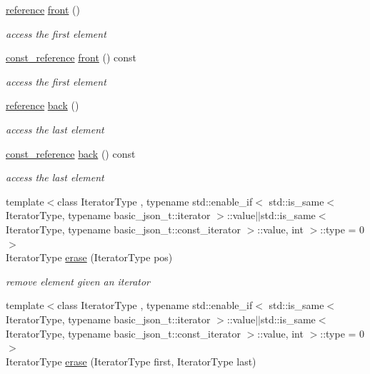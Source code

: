 \begin{DoxyCompactItemize}
\hyperlink{classnlohmann_1_1basic__json_a220ae98554a76205fb7f8822d36b2d5a}{reference} \hyperlink{classnlohmann_1_1basic__json_a5417ca43ae5e7a3a2f82eee2d915c6ed}{front} ()
\begin{DoxyCompactList}\small\item\em access the first element \end{DoxyCompactList}\item 
\hyperlink{classnlohmann_1_1basic__json_ab8a1c33ee7b154fc41ca2545aa9724e6}{const\+\_\+reference} \hyperlink{classnlohmann_1_1basic__json_aa610b6e86ca6306e89ea276befe7b2a2}{front} () const 
\begin{DoxyCompactList}\small\item\em access the first element \end{DoxyCompactList}\item 
\hyperlink{classnlohmann_1_1basic__json_a220ae98554a76205fb7f8822d36b2d5a}{reference} \hyperlink{classnlohmann_1_1basic__json_a30914ad0767ccdc3633f88a906ed7dfa}{back} ()
\begin{DoxyCompactList}\small\item\em access the last element \end{DoxyCompactList}\item 
\hyperlink{classnlohmann_1_1basic__json_ab8a1c33ee7b154fc41ca2545aa9724e6}{const\+\_\+reference} \hyperlink{classnlohmann_1_1basic__json_a015ebbecdb368c84d00fa2b3539d4429}{back} () const 
\begin{DoxyCompactList}\small\item\em access the last element \end{DoxyCompactList}\item 
{\footnotesize template$<$class Iterator\+Type , typename std\+::enable\+\_\+if$<$ std\+::is\+\_\+same$<$ Iterator\+Type, typename basic\+\_\+json\+\_\+t\+::iterator $>$\+::value$\vert$$\vert$std\+::is\+\_\+same$<$ Iterator\+Type, typename basic\+\_\+json\+\_\+t\+::const\+\_\+iterator $>$\+::value, int $>$\+::type  = 0$>$ }\\Iterator\+Type \hyperlink{classnlohmann_1_1basic__json_a494632b69bbe1d0153d3bedad0901b8e}{erase} (Iterator\+Type pos)
\begin{DoxyCompactList}\small\item\em remove element given an iterator \end{DoxyCompactList}\item 
{\footnotesize template$<$class Iterator\+Type , typename std\+::enable\+\_\+if$<$ std\+::is\+\_\+same$<$ Iterator\+Type, typename basic\+\_\+json\+\_\+t\+::iterator $>$\+::value$\vert$$\vert$std\+::is\+\_\+same$<$ Iterator\+Type, typename basic\+\_\+json\+\_\+t\+::const\+\_\+iterator $>$\+::value, int $>$\+::type  = 0$>$ }\\Iterator\+Type \hyperlink{classnlohmann_1_1basic__json_a8ac83750e267e37d5d47591eb44cce42}{erase} (Iterator\+Type first, Iterator\+Type last)

\end{DoxyCompactItemize}
